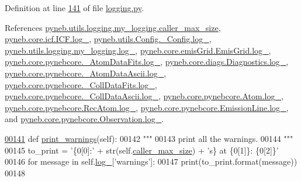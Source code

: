 Definition at line \hyperlink{logging_8py_source_l00141}{141} of file \hyperlink{logging_8py_source}{logging.\+py}.



References \hyperlink{logging_8py_source_l00040}{pyneb.\+utils.\+logging.\+my\+\_\+logging.\+caller\+\_\+max\+\_\+size}, \hyperlink{icf_8py_source_l00015}{pyneb.\+core.\+icf.\+I\+C\+F.\+log\+\_\+}, \hyperlink{_config_8py_source_l00031}{pyneb.\+utils.\+Config.\+\_\+\+Config.\+log\+\_\+}, \hyperlink{logging_8py_source_l00033}{pyneb.\+utils.\+logging.\+my\+\_\+logging.\+log\+\_\+}, \hyperlink{emis_grid_8py_source_l00040}{pyneb.\+core.\+emis\+Grid.\+Emis\+Grid.\+log\+\_\+}, \hyperlink{pynebcore_8py_source_l00080}{pyneb.\+core.\+pynebcore.\+\_\+\+Atom\+Data\+Fits.\+log\+\_\+}, \hyperlink{diags_8py_source_l00168}{pyneb.\+core.\+diags.\+Diagnostics.\+log\+\_\+}, \hyperlink{pynebcore_8py_source_l00301}{pyneb.\+core.\+pynebcore.\+\_\+\+Atom\+Data\+Ascii.\+log\+\_\+}, \hyperlink{pynebcore_8py_source_l00557}{pyneb.\+core.\+pynebcore.\+\_\+\+Coll\+Data\+Fits.\+log\+\_\+}, \hyperlink{pynebcore_8py_source_l00906}{pyneb.\+core.\+pynebcore.\+\_\+\+Coll\+Data\+Ascii.\+log\+\_\+}, \hyperlink{pynebcore_8py_source_l01162}{pyneb.\+core.\+pynebcore.\+Atom.\+log\+\_\+}, \hyperlink{pynebcore_8py_source_l02562}{pyneb.\+core.\+pynebcore.\+Rec\+Atom.\+log\+\_\+}, \hyperlink{pynebcore_8py_source_l03262}{pyneb.\+core.\+pynebcore.\+Emission\+Line.\+log\+\_\+}, and \hyperlink{pynebcore_8py_source_l03418}{pyneb.\+core.\+pynebcore.\+Observation.\+log\+\_\+}.


\begin{DoxyCode}
\hypertarget{classpyneb_1_1utils_1_1logging_1_1my__logging_l00141}{}\hyperlink{classpyneb_1_1utils_1_1logging_1_1my__logging_a7791971e98a02aadfb07d77b82db9ec0}{00141}     \textcolor{keyword}{def }\hyperlink{classpyneb_1_1utils_1_1logging_1_1my__logging_a7791971e98a02aadfb07d77b82db9ec0}{print\_warnings}(self):
00142         \textcolor{stringliteral}{"""}
00143 \textcolor{stringliteral}{        print all the warnings.}
00144 \textcolor{stringliteral}{        """}
00145         to\_print = \textcolor{stringliteral}{'\{0[0]:'} + str(self.\hyperlink{classpyneb_1_1utils_1_1logging_1_1my__logging_a0449825f771bc794da88ba49666726d5}{caller\_max\_size}) + \textcolor{stringliteral}{'s\} at \{0[1]\}: \{0[2]\}'} 
00146         \textcolor{keywordflow}{for} message \textcolor{keywordflow}{in} self.\hyperlink{classpyneb_1_1utils_1_1logging_1_1my__logging_a4bda17b594629b5490207080dbcb3bbd}{log\_}[\textcolor{stringliteral}{'warnings'}]:
00147             print(to\_print.format(message))
00148     
\end{DoxyCode}
\hypertarget{classpyneb_1_1utils_1_1logging_1_1my__logging_add0fcb8b9321526315dbf724c9b09064}{}
